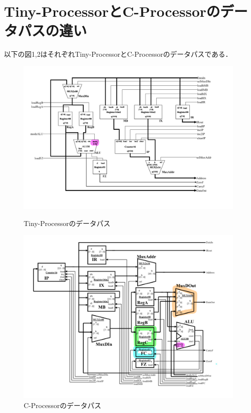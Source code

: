 \documentclass[dvipdfmx]{jarticle}
\begin{document}
\section{Tiny-ProcessorとC-Processorのデータパスの違い}
以下の図1,2はそれぞれTiny-ProcessorとC-Processorのデータパスである．
\begin{figure}[h]
  \centering
  \begin{minipage}[b]{0.49\columnwidth}
      \centering
      \includegraphics[width=1.1\columnwidth]{Tiny_datapath.png}
      \caption{Tiny-Processorのデータパス}
      \label{fig:a}
  \end{minipage}
  \begin{minipage}[b]{0.49\columnwidth}
      \centering
      \includegraphics[width=1.1\columnwidth]{C_datapath.png}
      \caption{C-Processorのデータパス}
      \label{fig:b}
  \end{minipage}
  \end{figure}
\end{document}
